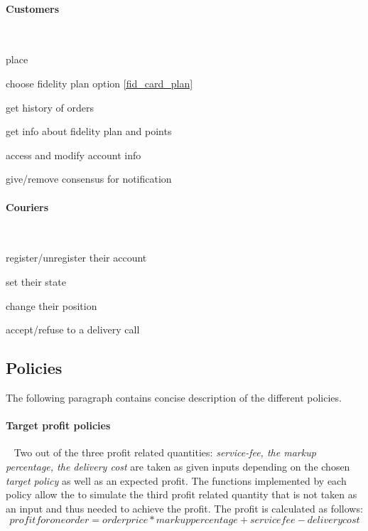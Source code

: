 \paragraph*{Customers}~\vspace{0.3\baselineskip}
\begin{itemize}
  \begin{minipage}{0.47\linewidth}
    \item place \Order
    \item choose fidelity plan option \ref{fid_card_plan}
    \item get history of orders
  \end{minipage}
  \begin{minipage}{0.53\linewidth}
    \item get info about fidelity plan and points
    \item access and modify account info
    \item give/remove consensus for notification
  \end{minipage}
\end{itemize}

\paragraph*{Couriers}~\vspace{0.3\baselineskip}
\begin{itemize}
  \begin{minipage}{0.47\linewidth}
    \item register/unregister their account
    \item set their state
  \end{minipage}
  \begin{minipage}{0.53\linewidth}
    \item change their position
    \item accept/refuse to a delivery call
  \end{minipage}
\end{itemize}

\subsection{Policies} %
\label{sub:policies}
The following paragraph contains concise description  
of the different policies.

\paragraph{Target profit policies}~\vspace{0.3\baselineskip}
Two out of the three profit related quantities: \emph{service-fee, the markup percentage, the delivery cost}
are taken as given inputs depending on the chosen \emph{target policy} as well as an expected profit. The functions implemented
by each policy allow the \Manager to simulate the third profit related quantity that is not taken as an input and thus 
needed to achieve the profit. The profit is calculated as follows: 
\[ profit for one order = order price * markup percentage + service fee - delivery cost \] 

